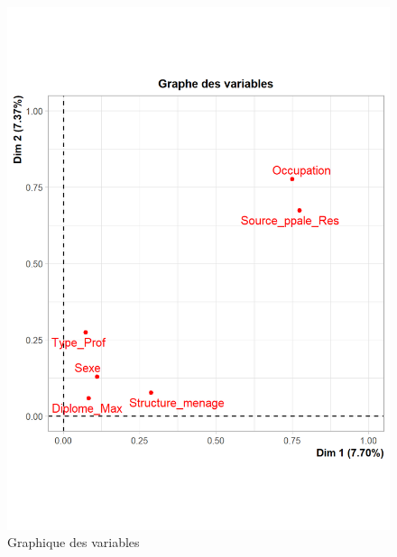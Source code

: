 \documentclass[11pt,a4paper, x11names]{article}\usepackage[]{graphicx}\usepackage[]{color}
\begin{document}
\begin{mdframed}
\begin{minipage}{0.45\textwidth}
\begin{figure}[H]
\includegraphics[scale=0.5]{graphiques/MCA1.png}
\caption{Graphique des variables} \label{fig5:MCA1}
\end{figure}
\end{minipage}
\hfill
\begin{minipage}{0.45\textwidth}
\begin{figure}[H]

\end{figure}
\end{minipage}
\end{mdframed}
\end{document}

